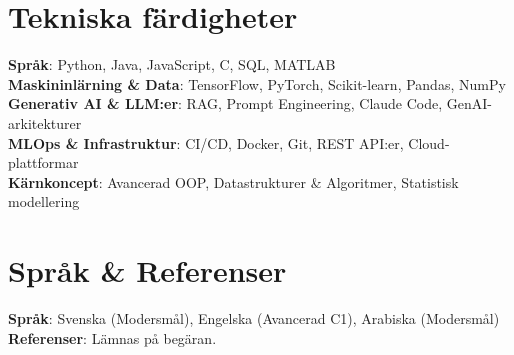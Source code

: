 \documentclass[10pt,a4paper]{article}
\begin{document}
\section{Tekniska färdigheter}
 \begin{itemize}[leftmargin=0.0in, label={}]
    \small{\item{
     \textbf{Språk}{: Python, Java, JavaScript, C, SQL, MATLAB} \\
     \textbf{Maskininlärning \& Data}{: TensorFlow, PyTorch, Scikit-learn, Pandas, NumPy} \\
     \textbf{Generativ AI \& LLM:er}{: RAG, Prompt Engineering, Claude Code, GenAI-arkitekturer} \\
     \textbf{MLOps \& Infrastruktur}{: CI/CD, Docker, Git, REST API:er, Cloud-plattformar} \\
     \textbf{Kärnkoncept}{: Avancerad OOP, Datastrukturer \& Algoritmer, Statistisk modellering}
    }}
 \end{itemize}

\section{Språk \& Referenser}
 \begin{itemize}[leftmargin=0.0in, label={}]
    \small{\item{
     \textbf{Språk}{: Svenska (Modersmål), Engelska (Avancerad C1), Arabiska (Modersmål)} \\
     \textbf{Referenser}{: Lämnas på begäran.}
    }}
 \end{itemize}
\end{document}

